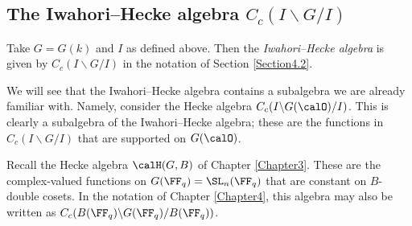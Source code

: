\documentclass[11pt]{amsart}
\theoremstyle{remark}
\begin{document}

\subsection{The Iwahori--Hecke algebra $C_c(I\backslash G/I)$}
Take $G=G(k)$ and $I$ as defined above.
Then the \emph{Iwahori--Hecke algebra} is given by $C_c(I\backslash G/I)$ in the notation of Section \ref{Section4.2}.

We will see that the Iwahori--Hecke algebra contains a subalgebra we are already familiar with.
Namely, consider the Hecke algebra $C_c(I\backslash G(\calO)/I)$.
This is clearly a subalgebra of the Iwahori--Hecke algebra; these are the functions in $C_c(I\backslash G/I)$ that are supported on $G(\calO)$.

Recall the Hecke algebra $\calH(G,B)$ of Chapter \ref{Chapter3}.
These are the complex-valued functions on $G(\FF_q)=\SL_n(\FF_q)$ that are constant on $B$-double cosets.
In the notation of Chapter \ref{Chapter4}, this algebra may also be written as $C_c(B(\FF_q)\backslash G(\FF_q)/B(\FF_q))$.
\end{document}
